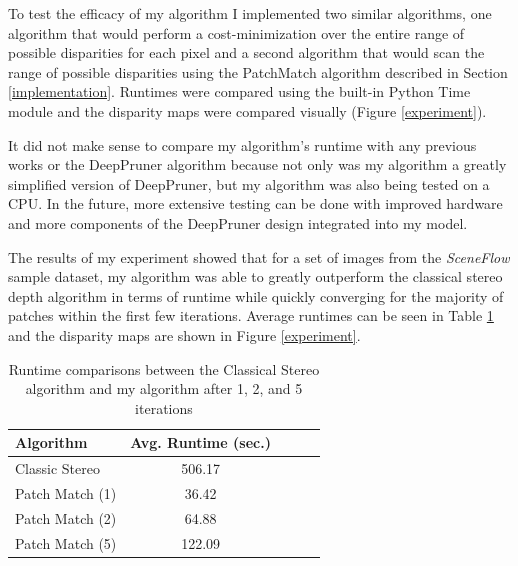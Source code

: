 \documentclass{article}
\begin{document}
To test the efficacy of my algorithm I implemented two similar algorithms, one algorithm that would perform a cost-minimization over the entire range of possible disparities for each pixel and a second algorithm that would scan the range of possible disparities using the PatchMatch algorithm described in Section \ref{implementation}. Runtimes were compared using the built-in Python Time module and the disparity maps were compared visually (Figure \ref{experiment}).

It did not make sense to compare my algorithm’s runtime with any previous works or the DeepPruner algorithm because not only was my algorithm a greatly simplified version of DeepPruner, but my algorithm was also being tested on a CPU. In the future, more extensive testing can be done with improved hardware and more components of the DeepPruner design integrated into my model.

The results of my experiment showed that for a set of images from the \textit{SceneFlow} \citep{mayer2016large} sample dataset, my algorithm was able to greatly outperform the classical stereo depth algorithm in terms of runtime while quickly converging for the majority of patches within the first few iterations. Average runtimes can be seen in Table \ref{table} and the disparity maps are shown in Figure \ref{experiment}.

\begin{table}[t]
\label{table}
\vskip 0.02in
\begin{center}
\begin{small}
\begin{sc}
\begin{tabular}{lcccr}
\toprule
\textbf{Algorithm} & \textbf{Avg. Runtime (sec.)} \\
\midrule
Classic Stereo & 506.17 \\
Patch Match (1) & 36.42 \\
Patch Match (2) & 64.88 \\
Patch Match (5) & 122.09 \\
\bottomrule
\end{tabular}
\end{sc}
\end{small}
\end{center}
\vskip -0.1in
\caption{Runtime comparisons between the Classical Stereo algorithm and my algorithm after 1, 2, and 5 iterations}
\end{table}
\end{document}
